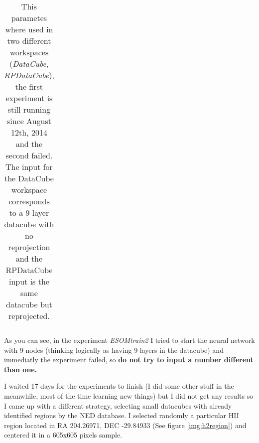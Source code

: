 \documentclass[11pt,fleqn]{book} %
\begin{document}
\begin{table}[h!]
\begin{tabular}{ c c c c c c }
																																																																																																																																																																																																																																																																																      \hline
																																																																																																																																																																																																																																																																																        \end{tabular}
																																																																																																																																																																																																																																																																																	  \caption{This parametes where used in two different workspaces (\emph{DataCube, RPDataCube}), the first experiment is still running since August 12th, 2014 and the second failed. The input for the DataCube workspace corresponds to a 9 layer datacube with no reprojection and the RPDataCube input is the same datacube but reprojected.}
																																																																																																																																																																																																																																																																																	    \label{tab:cubeesom}
																																																																																																																																																																																																																																																																																	    \end{table}

																																																																																																																																																																																																																																																																																	    As you can see, in the experiment \emph{ESOMtrain2} I tried to start the neural network with 9 nodes (thinking logically as having 9 layers in the datacube) and immediatly the experiment failed, so \textbf{do not try to input a number different than one.}

																																																																																																																																																																																																																																																																																	    I waited 17 days for the experiments to finish (I did some other stuff in the meanwhile, most of the time learning new things) but I did not get any results so I came up with a different strategy, selecting small datacubes with already identified regions by the NED database. I selected randomly a particular HII region located in RA 204.26971, DEC -29.84933 (See figure \ref{img:h2region}) and centered it in a 605x605 pixels sample.
\end{document}
